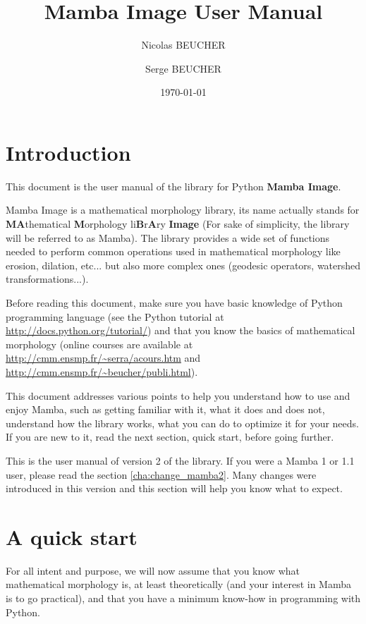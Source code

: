 \documentclass[a4paper,10pt,oneside]{article}
\title{Mamba Image User Manual}
\author{Nicolas BEUCHER \and Serge BEUCHER}
\date{\today}
\begin{document}
\mambaCover
\mambaContent
\mambaFigures

\section{Introduction}

This document is the user manual of the library for Python \textbf{Mamba Image}.

Mamba Image is a mathematical morphology library, its name actually stands for 
\textbf{MA}thematical \textbf{M}orphology li\textbf{B}r\textbf{A}ry \textbf{Image} 
(For sake of simplicity, the library will be referred to as Mamba). The library 
provides a wide set of functions needed to perform common operations used in 
mathematical morphology like erosion, dilation, etc... but also more complex ones
(geodesic operators, watershed transformations...).

Before reading this document, make sure you have basic knowledge of Python
programming language (see the Python tutorial at 
\url{http://docs.python.org/tutorial/}) and that you know the basics of 
mathematical morphology (online courses are available at 
\url{http://cmm.ensmp.fr/~serra/acours.htm} and \url{http://cmm.ensmp.fr/~beucher/publi.html}).

This document addresses various points to help you understand how to use and
enjoy Mamba, such as getting familiar with it, what it does and does not,
understand how the library works, what you can do to optimize it for your
needs. If you are new to it, read the next section, quick start, before going
further.

This is the user manual of version 2 of the library. If you were a Mamba 1 or
1.1 user, please read the section \ref{cha:change_mamba2}. Many changes
were introduced in this version and this section will help you know what to
expect.

\pagebreak

\section{A quick start}

For all intent and purpose, we will now assume that you know what mathematical
morphology is, at least theoretically (and your interest in Mamba is to go 
practical), and that you have a minimum know-how in programming with Python.
\end{document}
